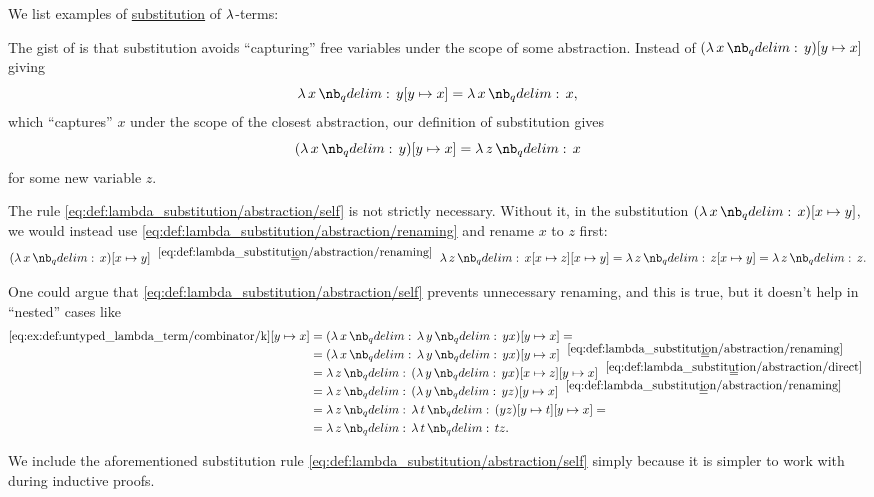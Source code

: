 \begin{example}\label{ex:def:lambda_substitution}
  We list examples of \hyperref[def:lambda_substitution]{substitution} of \( \mathrm{\lambda} \)-terms:
  \begin{thmenum}
     The gist of  is that substitution avoids \enquote{capturing} free variables under the scope of some abstraction. Instead of \( (\qabs x y)[y \mapsto x] \) giving
    \begin{equation*}
      \qabs x y[y \mapsto x] = \qabs x x,
    \end{equation*}
    which \enquote{captures} \( x \) under the scope of the closest abstraction, our definition of substitution gives
    \begin{equation*}
      (\qabs x y)[y \mapsto x] = \qabs z x
    \end{equation*}
    for some new variable \( z \).

     The rule \eqref{eq:def:lambda_substitution/abstraction/self} is not strictly necessary. Without it, in the substitution \( (\qabs x x)[x \mapsto y] \), we would instead use \eqref{eq:def:lambda_substitution/abstraction/renaming} and rename \( x \) to \( z \) first:
    \begin{equation*}
      (\qabs x x)[x \mapsto y]
      \reloset {\eqref{eq:def:lambda_substitution/abstraction/renaming}} =
      \qabs z x[x \mapsto z][x \mapsto y]
      =
      \qabs z z[x \mapsto y]
      =
      \qabs z z.
    \end{equation*}

    One could argue that \eqref{eq:def:lambda_substitution/abstraction/self} prevents unnecessary renaming, and this is true, but it doesn't help in \enquote{nested} cases like
    \begin{align*}
      \ref{eq:ex:def:untyped_lambda_term/combinator/k}[y \mapsto x]
      &=
      (\qabs x \qabs y yx)[y \mapsto x]
      = \\ &=
      (\qabs x \qabs y yx)[y \mapsto x]
      \reloset {\eqref{eq:def:lambda_substitution/abstraction/renaming}} = \\ &=
      \qabs z (\qabs y yx)[x \mapsto z][y \mapsto x]
      \reloset {\eqref{eq:def:lambda_substitution/abstraction/direct}} = \\ &=
      \qabs z (\qabs y yz)[y \mapsto x]
      \reloset {\eqref{eq:def:lambda_substitution/abstraction/renaming}} = \\ &=
      \qabs z \qabs t (yz)[y \mapsto t][y \mapsto x]
       = \\ &=
      \qabs z \qabs t tz.
    \end{align*}

    We include the aforementioned substitution rule \eqref{eq:def:lambda_substitution/abstraction/self} simply because it is simpler to work with during inductive proofs.
  \end{thmenum}
\end{example}

